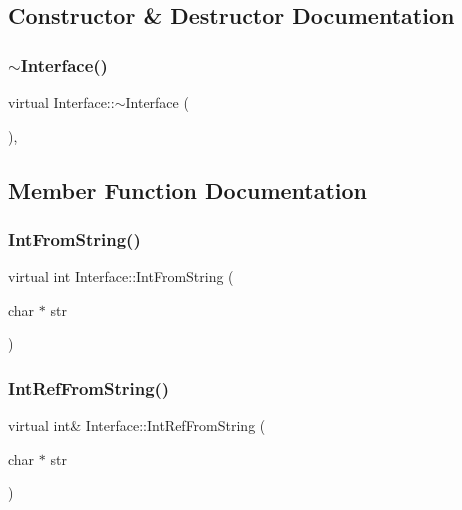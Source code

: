 \subsection{Constructor \& Destructor Documentation}
\mbox{\label{class_interface_a67eca71a4ef8d28dc959dd495e2b2b59}} 
\subsubsection{\texorpdfstring{$\sim$\+Interface()}{~Interface()}}
{\footnotesize\ttfamily virtual Interface\+::$\sim$\+Interface (\begin{DoxyParamCaption}{ }\end{DoxyParamCaption})\hspace{0.3cm}{\ttfamily [inline]}, {\ttfamily [virtual]}}



\subsection{Member Function Documentation}
\mbox{\label{class_interface_ab34c8a5fd2236a6b009f86a4e5851b61}} 
\subsubsection{\texorpdfstring{Int\+From\+String()}{IntFromString()}}
{\footnotesize\ttfamily virtual int Interface\+::\+Int\+From\+String (\begin{DoxyParamCaption}\item[{char $\ast$}]{str }\end{DoxyParamCaption})\hspace{0.3cm}{\ttfamily [pure virtual]}}

\mbox{\label{class_interface_ab93276de67e60c44fd775d4c139aa8e1}} 
\subsubsection{\texorpdfstring{Int\+Ref\+From\+String()}{IntRefFromString()}}
{\footnotesize\ttfamily virtual int\& Interface\+::\+Int\+Ref\+From\+String (\begin{DoxyParamCaption}\item[{char $\ast$}]{str }\end{DoxyParamCaption})\hspace{0.3cm}{\ttfamily [pure virtual]}}

